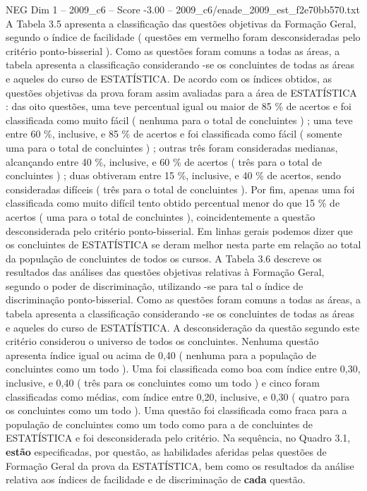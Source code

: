 \begin{textsample}{NEG Dim 1 – 2009\_c6 – Score -3.00 – 2009\_c6/enade\_2009\_est\_f2e70bb570.txt}
A Tabela 3.5 apresenta a classificação das questões objetivas da Formação Geral, segundo o índice de facilidade ( questões em vermelho foram desconsideradas pelo critério ponto-bisserial ).
Como as questões foram comuns a todas as áreas, a tabela apresenta a classificação considerando -se os concluintes de todas as áreas e aqueles do curso de ESTATÍSTICA.
De acordo com os índices obtidos, as questões objetivas da prova foram assim avaliadas para a área de ESTATÍSTICA : das oito questões, uma teve percentual igual ou maior de 85 \% de acertos e foi classificada como muito fácil ( nenhuma para o total de concluintes ) ; uma teve entre 60 \%, inclusive, e 85 \% de acertos e foi classificada como fácil ( somente uma para o total de concluintes ) ; outras três foram consideradas medianas, alcançando entre 40 \%, inclusive, e 60 \% de acertos ( três para o total de concluintes ) ; duas obtiveram entre 15 \%, inclusive, e 40 \% de acertos, sendo consideradas difíceis ( três para o total de concluintes ).
Por fim, apenas uma foi classificada como muito difícil tento obtido percentual menor do que 15 \% de acertos ( uma para o total de concluintes ), coincidentemente a questão desconsiderada pelo critério ponto-bisserial.
Em linhas gerais podemos dizer que os concluintes de ESTATÍSTICA se deram melhor nesta parte em relação ao total da população de concluintes de todos os cursos.
A Tabela 3.6 descreve os resultados das análises das questões objetivas relativas à Formação Geral, segundo o poder de discriminação, utilizando -se para tal o índice de discriminação ponto-bisserial.
Como as questões foram comuns a todas as áreas, a tabela apresenta a classificação considerando -se os concluintes de todas as áreas e aqueles do curso de ESTATÍSTICA.
A desconsideração da questão segundo este critério considerou o universo de todos os concluintes.
Nenhuma questão apresenta índice igual ou acima de 0,40 ( nenhuma para a população de concluintes como um todo ).
Uma foi classificada como boa com índice entre 0,30, inclusive, e 0,40 ( três para os concluintes como um todo ) e cinco foram classificadas como médias, com índice entre 0,20, inclusive, e 0,30 ( quatro para os concluintes como um todo ).
Uma questão foi classificada como fraca para a população de concluintes como um todo como para a de concluintes de ESTATÍSTICA e foi desconsiderada pelo critério.
Na sequência, no Quadro 3.1, \textbf{estão} especificadas, por questão, as habilidades aferidas pelas questões de Formação Geral da prova da ESTATÍSTICA, bem como os resultados da análise relativa aos índices de facilidade e de discriminação de \textbf{cada} questão.

\end{textsample}
